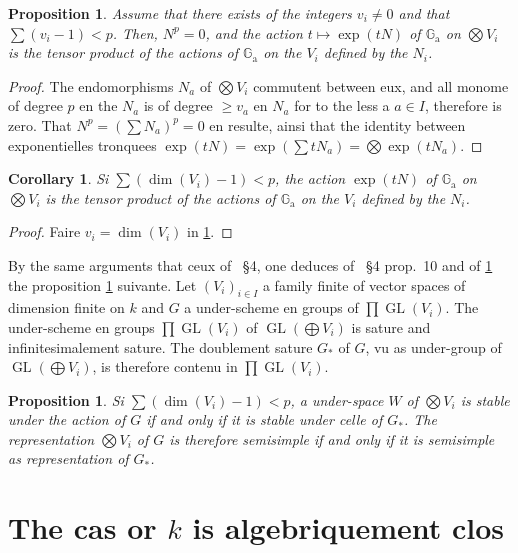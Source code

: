 \documentclass[11pt,a4paper]{article}
\theoremstyle{plain}
\newtheorem{proposition}[theorem]{Proposition}
\newtheorem{corollary}[theorem]{Corollary}
\theoremstyle{definition}
\DeclareMathOperator{\GL}{GL}
\newcommand{\Ga}{\mathbb{G}_\mathrm{a}}
\begin{document}
\begin{proposition}\label{prop:2.2}
Assume that there exists of the integers $v_i \neq 0$ and that $\sum (v_i - 1) < p$. Then, $N^p = 0$, and the action $t \mapsto \exp(tN)$ of $\Ga$ on $\bigotimes V_i$ is the tensor product of the actions of $\Ga$ on the $V_i$ defined by the $N_i$.
\end{proposition}

\begin{proof}
The endomorphisms $N_a$ of $\bigotimes V_i$ commutent between eux, and all monome of degree $p$ en the $N_a$ is of degree $\geq v_a$ en $N_a$ for to the less a $a \in I$, therefore is zero. That $N^p = (\sum N_a)^p = 0$ en resulte, ainsi that the identity between exponentielles tronquees $\exp(tN) = \exp(\sum tN_a) = \bigotimes \exp(tN_a)$.
\end{proof}

\begin{corollary}\label{cor:2.3}
Si $\sum (\dim(V_i) - 1) < p$, the action $\exp(tN)$ of $\Ga$ on $\bigotimes V_i$ is the tensor product of the actions of $\Ga$ on the $V_i$ defined by the $N_i$.
\end{corollary}

\begin{proof}
Faire $v_i = \dim(V_i)$ in \ref{prop:2.2}.
\end{proof}

By the same arguments that ceux of \cite{Serre1994}~\S4, one deduces of \cite{Serre1994}~\S4 prop.~10 and of \ref{cor:2.3} the proposition \ref{prop:2.4} suivante. Let $(V_i)_{i \in I}$ a family finite of vector spaces of dimension finite on $k$ and $G$ a under-scheme en groups of $\prod \GL(V_i)$. The under-scheme en groups $\prod \GL(V_i)$ of $\GL(\bigoplus V_i)$ is sature and infinitesimalement sature. The doublement sature $G_*$ of $G$, vu as under-group of $\GL(\bigoplus V_i)$, is therefore contenu in $\prod \GL(V_i)$.

\begin{proposition}\label{prop:2.4}
Si $\sum (\dim(V_i) - 1) < p$, a under-space $W$ of $\bigotimes V_i$ is stable under the action of $G$ if and only if it is stable under celle of $G_*$. The representation $\bigotimes V_i$ of $G$ is therefore semisimple if and only if it is semisimple as representation of $G_*$.
\end{proposition}

\section{The cas or $k$ is algebriquement clos}\label{sec:3}
\end{document}
